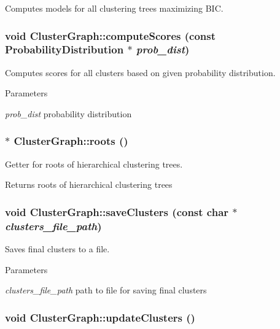 Computes models for all clustering trees maximizing BIC. \hypertarget{classClusterGraph_afb7b884082ea4ef1643d6b94b3dfd0da}{
\subsubsection[{computeScores}]{\setlength{\rightskip}{0pt plus 5cm}void ClusterGraph::computeScores (const {\bf ProbabilityDistribution} $\ast$ {\em prob\_\-dist})}}
\label{classClusterGraph_afb7b884082ea4ef1643d6b94b3dfd0da}


Computes scores for all clusters based on given probability distribution. 
\begin{DoxyParams}{Parameters}
\item[{\em prob\_\-dist}]probability distribution \end{DoxyParams}
\hypertarget{classClusterGraph_a46e64fce525cf3e06a1966ef4aa3b594}{
\subsubsection[{roots}]{ $\ast$ ClusterGraph::roots ()}}
\label{classClusterGraph_a46e64fce525cf3e06a1966ef4aa3b594}


Getter for roots of hierarchical clustering trees. \begin{DoxyReturn}{Returns}
roots of hierarchical clustering trees 
\end{DoxyReturn}
\hypertarget{classClusterGraph_aeffbcb6f23718cbf4b8218b1388be882}{
\subsubsection[{saveClusters}]{\setlength{\rightskip}{0pt plus 5cm}void ClusterGraph::saveClusters (const char $\ast$ {\em clusters\_\-file\_\-path})}}
\label{classClusterGraph_aeffbcb6f23718cbf4b8218b1388be882}


Saves final clusters to a file. 
\begin{DoxyParams}{Parameters}
\item[{\em clusters\_\-file\_\-path}]path to file for saving final clusters \end{DoxyParams}
\hypertarget{classClusterGraph_a291b24dc28a367f08115764812805e40}{
\subsubsection[{updateClusters}]{\setlength{\rightskip}{0pt plus 5cm}void ClusterGraph::updateClusters ()}}
\label{classClusterGraph_a291b24dc28a367f08115764812805e40}


